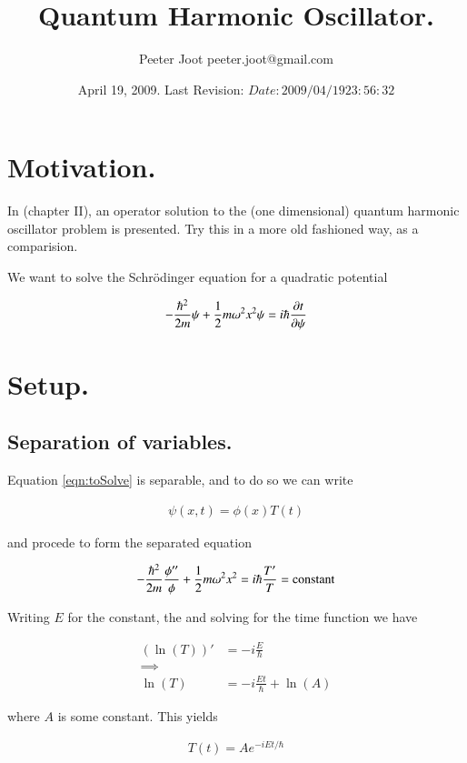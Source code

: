 \documentclass{article}
\title{ Quantum Harmonic Oscillator. }
\author{Peeter Joot \quad peeter.joot@gmail.com }
\date{ April 19, 2009.  Last Revision: $Date: 2009/04/19 23:56:32 $ }
\begin{document}
\maketitle{}
\tableofcontents
\section{ Motivation. }

In \cite{byron1992mca} (chapter II), an operator solution to the
(one dimensional) quantum
harmonic oscillator problem is presented.  Try this in a more old fashioned way,
as a comparision.

We want to solve the Schr\"{o}dinger equation for a quadratic potential

\begin{align}\label{eqn:toSolve}
-\frac{\hbar^2}{2m} \psi + \frac{1}{2} m \omega^2 x^2 \psi = i \hbar \frac{\partial{t}}{\partial {\psi}}
\end{align}

\section{ Setup. }

\subsection{ Separation of variables. }

Equation \ref{eqn:toSolve} is separable, and to do so we can write

\begin{align*}
\psi(x,t) = \phi(x) T(t)
\end{align*}

and procede to form the separated equation

\begin{align*}
-\frac{\hbar^2}{2m} \frac{\phi''}{\phi} + \frac{1}{2} m \omega^2 x^2 = i \hbar \frac{T'}{T} = \text{constant}
\end{align*}

Writing $E$ for the constant, the and solving for the time function we have

\begin{align*}
(\ln(T))' &= -i \frac{E}{\hbar} \\
\implies \\
\ln(T) &= -i \frac{Et}{\hbar} + \ln(A)
\end{align*}

where $A$ is some constant.  This yields

\begin{align*}
T(t) = A e^{ -i E t/\hbar }
\end{align*}
\end{document}
